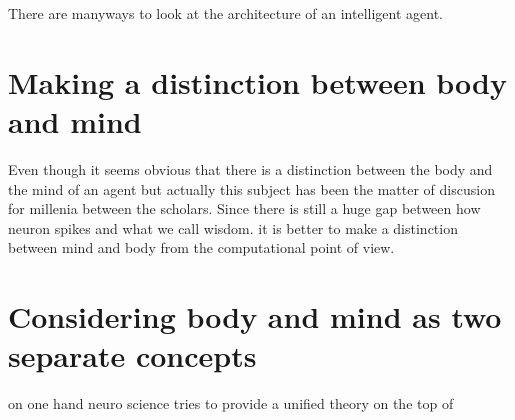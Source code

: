 \documentclass[a4paper]{article}
\title{}
\date{}
\begin{document}
    \maketitle
    There are manyways to look at the architecture of an intelligent agent.
    
    \section{Making a distinction between body and  mind}
    Even though it seems obvious that there is a distinction between the body and the mind of an agent but actually this subject has been the matter of discusion for millenia between the scholars. 
        Since there is still a huge gap between how neuron spikes and what we call wisdom. it is better to make a distinction between mind and body from the computational point of view.
    
    \section{Considering body and mind as two separate concepts}
    
    
    
    on one hand neuro science tries to provide a unified theory on the top of
    
\end{document}
